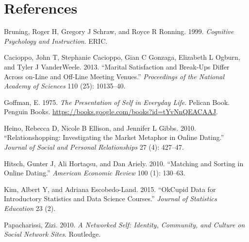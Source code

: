 \documentclass[]{article}
\begin{document}
\newpage

\hypertarget{references}{%
\section*{References}\label{references}}

\hypertarget{refs}{}
\leavevmode\hypertarget{ref-bruning1999cognitive}{}%
Bruning, Roger H, Gregory J Schraw, and Royce R Ronning. 1999.
\emph{Cognitive Psychology and Instruction}. ERIC.

\leavevmode\hypertarget{ref-cacioppo2013marital}{}%
Cacioppo, John T, Stephanie Cacioppo, Gian C Gonzaga, Elizabeth L
Ogburn, and Tyler J VanderWeele. 2013. ``Marital Satisfaction and
Break-Ups Differ Across on-Line and Off-Line Meeting Venues.''
\emph{Proceedings of the National Academy of Sciences} 110 (25):
10135--40.

\leavevmode\hypertarget{ref-goffman1975presentation}{}%
Goffman, E. 1975. \emph{The Presentation of Self in Everyday Life}.
Pelican Book. Penguin Books.
\url{https://books.google.com/books?id=tYvNnQEACAAJ}.

\leavevmode\hypertarget{ref-heino2010relationshopping}{}%
Heino, Rebecca D, Nicole B Ellison, and Jennifer L Gibbs. 2010.
``Relationshopping: Investigating the Market Metaphor in Online
Dating.'' \emph{Journal of Social and Personal Relationships} 27 (4):
427--47.

\leavevmode\hypertarget{ref-hitsch2010matching}{}%
Hitsch, Gunter J, Ali Hortaçsu, and Dan Ariely. 2010. ``Matching and
Sorting in Online Dating.'' \emph{American Economic Review} 100 (1):
130--63.

\leavevmode\hypertarget{ref-kim2015okcupid}{}%
Kim, Albert Y, and Adriana Escobedo-Land. 2015. ``OkCupid Data for
Introductory Statistics and Data Science Courses.'' \emph{Journal of
Statistics Education} 23 (2).

\leavevmode\hypertarget{ref-papacharissi2010networked}{}%
Papacharissi, Zizi. 2010. \emph{A Networked Self: Identity, Community,
and Culture on Social Network Sites}. Routledge.
\end{document}
